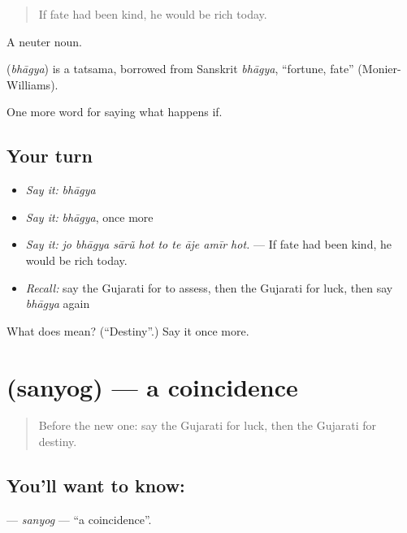 \begin{quote}
If fate had been kind, he would be rich today.
\end{quote}

A neuter noun.

\begin{cousinweb}
\textbf{} (\emph{bhāgya}) is a tatsama, borrowed from Sanskrit \emph{bhāgya}, \textquotedblleft{}fortune, fate\textquotedblright{} (Monier-Williams).
\end{cousinweb}

\begin{grammarlens}[title={What you've built}]
One more word for saying what happens if.
\end{grammarlens}

\subsection*{Your turn}
\begin{itemize}
\raggedright
  \item \emph{Say it:} \emph{bhāgya}
  \item \emph{Say it:} \emph{bhāgya}, once more
  \item \emph{Say it:} \emph{jo bhāgya sārũ hot to te āje amīr hot.} — If fate had been kind, he would be rich today.
  \item \emph{Recall:} say the Gujarati for to assess, then the Gujarati for luck, then say \emph{bhāgya} again
\end{itemize}

\begin{tcolorbox}[breakable,colback=teal!4,colframe=teal!35!black,title={Before you move on}]
What does  mean? (\textquotedblleft{}Destiny\textquotedblright{}.) Say it once more.
\end{tcolorbox}
\section[\texorpdfstring{\gu{સંયોગ} (sanyog)}{સંયોગ (sanyog)}]{ (sanyog) — a coincidence}

\label{lesson:GU-C368-sanyog}



\begin{quote}
Before the new one: say the Gujarati for luck, then the Gujarati for destiny.
\end{quote}

\subsection*{You'll want to know: }
\textbf{} — \emph{sanyog} — \textquotedblleft{}a coincidence\textquotedblright{}.

